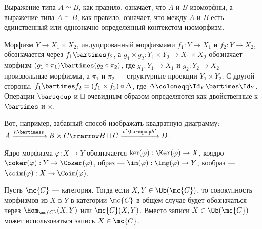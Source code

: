 \documentclass[
	extrafontsizes,
	11pt,
	hyphens,
]{memoir}
\begin{document}
\begin{notation}
Выражение типа \(A \simeq B\), как правило, означает, что \(A\) и \(B\) изоморфны, а выражение типа \(A \cong B\), как правило, означает, что между \(A\) и \(B\) есть единственный или однозначно определённый контекстом изоморфизм.
\end{notation}

\begin{notation}
\label{not:MorProdCoprod}
Морфизм \(Y \to X_1 \times X_2\), индуцированный морфизмами \(f_1: Y \to X_1\) и \(f_2 : Y \to X_2\),
обозначается через \(f_1 \bartimes f_2\),
а \(g_1 \times g_2 : Y_1 \times Y_2 \to X_1 \times X_2\) обозначает морфизм \((g_1 \circ \pi_1) \bartimes (g_2 \circ \pi_2)\), где \(g_1 : Y_1 \to X_1\) и \(g_2 : Y_2 \to X_2\) --- произвольные морфизмы, а \(\pi_1\) и \(\pi_2\) --- структурные проекции \(Y_1 \times Y_2\).
С другой стороны, \(f_1 \bartimes f_2 = (f_1 \times f_2) \circ \Delta\), где \(\Delta \coloneqq \Id_Y \bartimes \Id_Y\).
Операции \(\barsqcup\) и \(\sqcup\) очевидным образом определяются как двойственные к \(\bartimes\) и \(\times\).
\end{notation}

\begin{example}
Вот, например, забавный способ изображать квадратную диаграмму:
\(A \xrightarrow{h \bartimes v} B \times C \rrarrow B \sqcup C \xrightarrow{v' \barsqcup h'} D\).
\end{example}

\begin{notation}
Ядро морфизма \(\varphi : X \to Y\) обозначается \(\ker(\varphi) : \Ker(\varphi) \to X\),
коядро --- \(\coker(\varphi) : Y \to \Coker(\varphi)\),
образ --- \(\im(\varphi) : \Img(\varphi) \to Y\),
кообраз --- \(\coim(\varphi) : X \to \Coim(\varphi)\).
\end{notation}

\begin{notation}
Пусть \(\mc{C}\) --- категория. Тогда если \(X,Y \in \Ob(\mc{C})\), то совокупность морфизмов из \(X\) в \(Y\) в категории \(\mc{C}\) в общем случае будет обозначаться через \(\Hom_{\mc{C}}(X,Y)\) или \(\mc{C}(X,Y)\).
Вместо записи \(X \in \Ob(\mc{C})\) может использоваться запись \(X \in \mc{C}\).
\end{notation}
\end{document}
